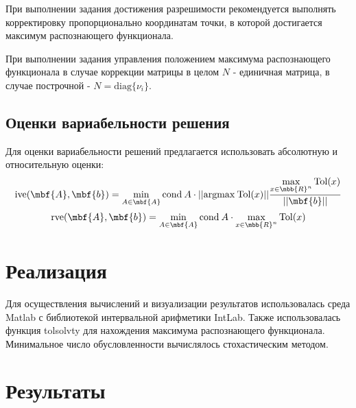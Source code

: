 \documentclass[a4paper]{article}
\begin{document}
При выполнении задания достижения разрешимости рекомендуется выполнять корректировку пропорционально координатам точки, в которой достигается максимум распознающего функционала. 

При выполнении задания управления положением максимума распознающего функционала в случае коррекции матрицы в целом $N$ - единичная матрица, в случае построчной - $ N=\mathrm{diag}\{\nu_i\}$. 
\subsection{Оценки вариабельности решения}
Для оценки вариабельности решений предлагается использовать абсолютную и относительную оценки:
$$\mathrm{ive}(\mbf{A},\mbf{b})=\min\limits_{A\in\mbf{A}}\mathrm{cond}\:A\cdot||\mathrm{argmax}\:\mathrm{Tol}(x)||\frac{\max\limits_{x\in\mbb{R}^n}\mathrm{Tol}(x)}{||\mbf{b}||}$$
$$\mathrm{rve}(\mbf{A},\mbf{b})=\min\limits_{A\in\mbf{A}}\mathrm{cond}\:A\cdot\max\limits_{x\in\mbb{R}^n}\mathrm{Tol}(x)$$
\section{Реализация}
Для осуществления вычислений и визуализации результатов использовалась среда Matlab с библиотекой интервальной арифметики IntLab. Также использовалась функция tolsolvty для нахождения максимума распознающего функционала. Минимальное число обусловленности вычислялось стохастическим методом. 
\section{Результаты}
\end{document}
